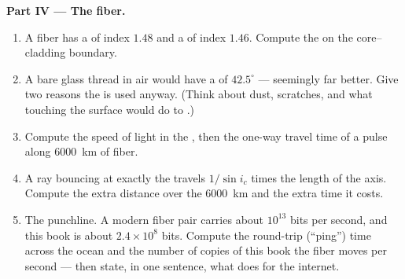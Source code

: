 \begin{problem}
\medskip
\noindent\textbf{Part IV --- The fiber.}
\begin{enumerate}[resume]
  \item A fiber has a  of index $1.48$ and a  of index
        $1.46$. Compute the  on the core--cladding
        boundary.
  \item A bare glass thread in air would have a  of
        $42.5^\circ$ --- seemingly far better. Give two reasons the
         is used anyway. (Think about dust, scratches, and what
        touching the surface would do to .)
  \item Compute the speed of light in the , then the one-way travel
        time of a pulse along \qty{6000}{km} of fiber.
  \item A ray bouncing at exactly the  travels
        $1/\sin i_c$ times the length of the axis. Compute the extra
        distance over the \qty{6000}{km} and the extra time it costs.
  \item The punchline. A modern fiber pair carries about $10^{13}$ bits
        per second, and this book is about $2.4 \times 10^8$ bits.
        Compute the round-trip (``ping'') time across the ocean and the
        number of copies of this book the fiber moves per second ---
        then state, in one sentence, what  does for the
        internet.
\end{enumerate}
\end{problem}
